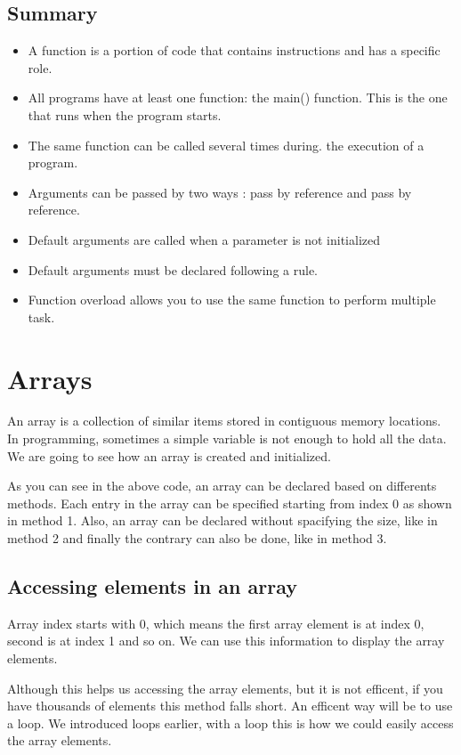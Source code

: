 \documentclass[11pt, a4paper]{article}
\begin{document}
\subsection{Summary}
\begin{itemize}
    \item A function is a portion of code that contains instructions
     and has a specific role.
    \item All programs have at least one function: the main() function.
     This is the one that runs when the program starts.
    \item The same function can be called several times during.
      the execution of a program.
    \item Arguments can be passed by two ways : pass by reference and pass by reference.
    \item Default arguments are called when a parameter is not initialized
    \item Default arguments must be declared following a rule.
    \item Function overload allows you to use the same function to perform multiple task.
\end{itemize}

\newpage
\section{Arrays}
An array is a collection of similar items stored in contiguous memory locations.
In programming, sometimes a simple variable is not enough to hold all the data.
We are going to see how an array is created and initialized.

As you can see in the above code, an array can be declared based on differents methods.
Each entry in the array can be specified starting from index 0 as shown in method 1. Also,
an array can be declared without spacifying the size, like in method 2 and finally the contrary
can also be done, like in method 3.

\subsection{Accessing elements in an array}
Array index starts with 0, which means the first array element is at index 0,
second is at index 1 and so on. We can use this information to display the array elements.

Although this helps us accessing the array elements, but it is not efficent, if you have thousands of
elements this method falls short. An efficent way will be to use a loop. We introduced loops earlier,
with a loop this is how we could easily access the array elements.

\end{document}
